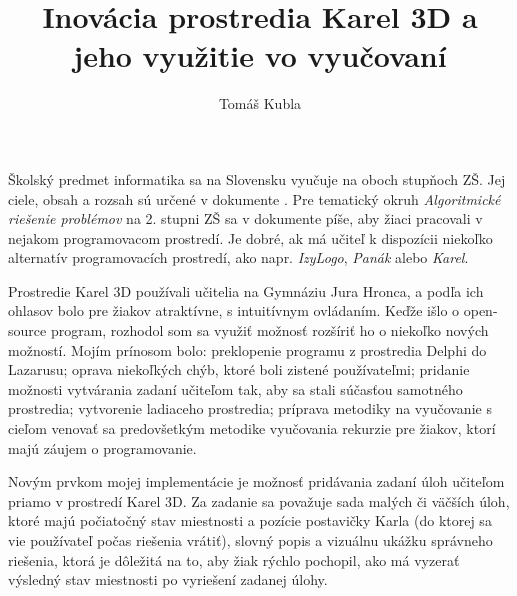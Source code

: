 \documentclass{svk_short_sk}
\begin{document}
\title{Inov\'acia prostredia Karel 3D a jeho vyu\v{z}itie vo vyu\v{c}ovan\'i}

\author{Tom\'a\v{s} Kubla
}




\maketitle

Školský predmet informatika sa na Slo\-ven\-sku vyučuje na oboch stupňoch ZŠ.
Jej ciele, obsah a rozsah sú určené v dokumente \cite{SPU}.
Pre tematický okruh \emph{Algoritmické riešenie problémov} na 2. stupni ZŠ sa v dokumente píše, aby žiaci pracovali v nejakom programovacom prostredí.
Je dobré, ak má učiteľ k dispozícii niekoľko alternatív programovacích prostredí, ako napr. \emph{IzyLogo}, \emph{Panák} alebo \emph{Karel}.

Prostredie Karel 3D \cite{KOSUT97} používali učitelia na Gymnáziu Jura Hronca, a podľa ich ohlasov bolo pre žiakov atraktívne, s intuitívnym ovládaním.
Keďže išlo o open-source program, rozhodol som sa využiť možnosť rozšíriť ho o niekoľko nových možností.
Mojím prínosom bolo:
preklopenie programu z prostredia Delphi do Lazarusu;
oprava niekoľkých chýb, ktoré boli zistené používateľmi;
pridanie možnosti vytvárania zadaní učiteľom tak, aby sa stali súčasťou samotného prostredia;
vytvorenie ladiaceho prostredia;
príprava metodiky na vyučovanie s cieľom venovať sa predovšetkým metodike vyučovania rekurzie pre žiakov, ktorí majú záujem o programovanie.

Novým prvkom mojej implementácie je možnosť pridávania zadaní úloh učiteľom priamo v prostredí Karel 3D.
Za zadanie sa považuje sada malých či väčších úloh, ktoré majú počiatočný stav miestnosti a pozície postavičky Karla (do ktorej sa vie používateľ počas riešenia vrátiť), slovný popis a vizuálnu ukážku správneho riešenia, ktorá je dôležitá na to, aby žiak rýchlo pochopil, ako má vyzerať výsledný stav miestnosti po vyriešení zadanej úlohy.
\end{document}
